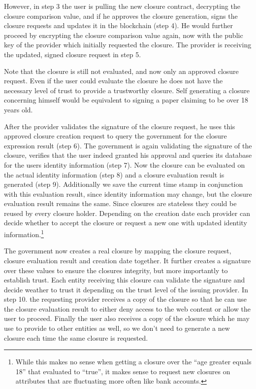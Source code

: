However, in step 3 the user is pulling the new closure contract, decrypting the closure comparison value, and if he approves the closure generation, signs the closure requests and updates it in the blockchain (step 4). He would further proceed by encrypting the closure comparison value again, now with the public key of the provider which initially requested the closure. The provider is receiving the updated, signed closure request in step 5. 

Note that the closure is still not evaluated, and now only an approved closure request. Even if the user could evaluate the closure he does not have the necessary level of trust to provide a trustworthy closure. Self generating a closure concerning himself would be equivalent to signing a paper claiming to be over 18 years old.

After the provider validates the signature of the closure request, he uses this approved closure creation request to query the government for the closure expression result (step 6). The government is again validating the signature of the closure, verifies that the user indeed granted his approval and queries its database for the users identity information (step 7). Now the closure can be evaluated on the actual identity information (step 8) and a closure evaluation result is generated (step 9). Additionally we save the current time stamp in conjunction with this evaluation result, since identity information may change, but the closure evaluation result remains the same. Since closures are stateless they could be reused by every closure holder. Depending on the creation date each provider can decide whether to accept the closure or request a new one with updated identity information.\footnote{While this makes no sense when getting a closure over the “age greater equals 18” that evaluated to “true”, it makes sense to request new closures on attributes that are fluctuating more often like bank accounts.} 

The government now creates a real closure by mapping the closure request, closure evaluation result and creation date together. It further creates a signature over these values to ensure the closures integrity, but more importantly to establish trust. Each entity receiving this closure can validate the signature and decide weather to trust it depending on the trust level of the issuing provider. In step 10. the requesting provider receives a copy of the closure so that he can use the closure evaluation result to either deny access to the web content or allow the user to proceed. Finally the user also receives a copy of the closure which he may use to provide to other entities as well, so we don’t need to generate a new closure each time the same closure is requested. 

